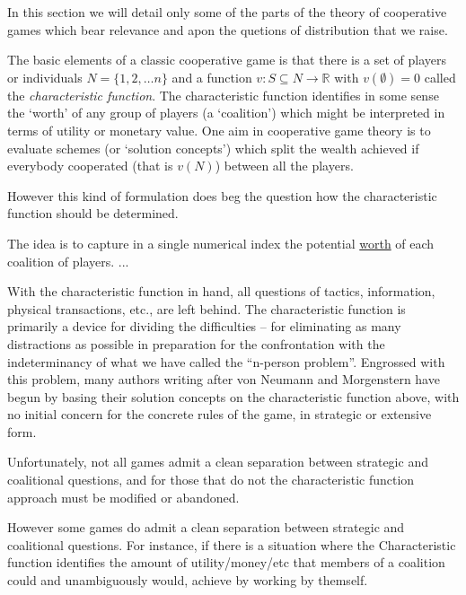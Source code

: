 In this section we will detail only some of the parts of the theory of cooperative games which bear relevance and apon the quetions of distribution that we raise.

The basic elements of a classic cooperative game is that there is a set of players or individuals $N=\{1,2,\dots n\}$ and a function $v: S\subseteq N \rightarrow \mathbb{R}$ with $v(\emptyset)=0$ called the \textit{characteristic function}.
The characteristic function identifies in some sense the `worth' of any group of players (a `coalition') which might be interpreted in terms of utility or monetary value.
One aim in cooperative game theory is to evaluate schemes (or `solution concepts') which split the wealth achieved if everybody cooperated (that is $v(N)$) between all the players.

However this kind of formulation does beg the question how the characteristic function should be determined.

\begin{displayquote}
The idea is to capture in a single numerical index the potential \underline{worth} of each coalition of players.
...

With the characteristic function in hand, all questions of tactics, information, physical transactions, etc., are left behind. The characteristic function is primarily a device for dividing the difficulties -- for eliminating as many distractions as possible in preparation for the confrontation with the indeterminancy of what we have called the ``n-person problem''. Engrossed with this problem, many authors writing after von Neumann and Morgenstern have begun by basing their solution concepts on the characteristic function above, with no initial concern for the concrete rules of the game, in strategic or extensive form.

Unfortunately, not all games admit a clean separation between strategic and coalitional questions, and for those that do not the characteristic function approach must be modified or abandoned.\cite{ShapleySchubikCharacteristicFunction}
\end{displayquote}

However some games do admit a clean separation between strategic and coalitional questions.
For instance, if there is a situation where the Characteristic function identifies the amount of utility/money/etc that members of a coalition could and unambiguously would, achieve by working by themself.

